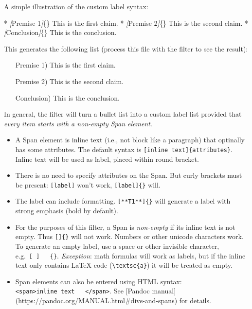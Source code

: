 \documentclass[
]{article}
\newenvironment{Shaded}{}{}
\newcommand{\CommentTok}[1]{\textcolor[rgb]{0.38,0.63,0.69}{\textit{#1}}}
\newcommand{\NormalTok}[1]{#1}
\newcommand{\OtherTok}[1]{\textcolor[rgb]{0.00,0.44,0.13}{#1}}
\newcommand{\SpecialStringTok}[1]{\textcolor[rgb]{0.73,0.40,0.53}{#1}}
\providecommand{\tightlist}{%
  \setlength{\itemsep}{0pt}\setlength{\parskip}{0pt}}
\begin{document}
A simple illustration of the custom label syntax:

\begin{Shaded}
\begin{Highlighting}[]
\SpecialStringTok{* }\CommentTok{[}\OtherTok{Premise 1}\CommentTok{]}\NormalTok{\{\} This is the first claim.}
\SpecialStringTok{* }\CommentTok{[}\OtherTok{Premise 2}\CommentTok{]}\NormalTok{\{\} This is the second claim.}
\SpecialStringTok{* }\CommentTok{[}\OtherTok{Conclusion}\CommentTok{]}\NormalTok{\{\} This is the conclusion.}
\end{Highlighting}
\end{Shaded}

This generates the following list (process this file with the filter to
see the result):

\begin{itemize}
\tightlist

\item[Premise 1)] This is the first claim.

\item[Premise 2)] This is the second claim.

\item[Conclusion)] This is the conclusion.

\end{itemize}

In general, the filter will turn a bullet list into a custom label list
provided that \emph{every item starts with a non-empty Span element}.

\begin{itemize}
\tightlist
\item
  A Span element is inline text (i.e., not block like a paragraph) that
  optinally has some attributes. The default syntax is
  \texttt{{[}inline\ text{]}\{attributes\}}. Inline text will be used as
  label, placed within round bracket.
\item
  There is no need to specify attributes on the Span. But curly brackets
  must be present: \texttt{{[}label{]}} won't work,
  \texttt{{[}label{]}\{\}} will.
\item
  The label can include formatting. \texttt{{[}**T1**{]}\{\}} will
  generate a label with strong emphasis (bold by default).
\item
  For the purposes of this filter, a Span is \emph{non-empty} if its
  inline text is not empty. Thus \texttt{{[}{]}\{\}} will not work.
  Numbers or other unicode characters work. To generate an empty label,
  use a space or other invisible character,
  e.g.~\texttt{{[}\ {]}\ \ \ \{\}}. \emph{Exception}: math formulas will
  work as labels, but if the inline text only contains LaTeX code
  (\texttt{\textbackslash{}textsc\{a\}}) it will be treated as empty.
\item
  Span elements can also be entered using HTML syntax:
  \texttt{\textless{}span\textgreater{}inline\ text\ \ \ \textless{}/span\textgreater{}}.
  See {[}Pandoc manual{]}
  (https://pandoc.org/MANUAL.html\#divs-and-spans) for details.
\end{itemize}
\end{document}
